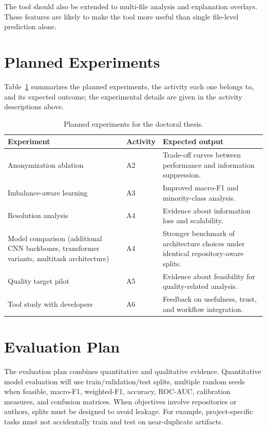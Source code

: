The tool should also be extended to multi-file analysis and explanation
overlays. These features are likely to make the tool more useful than single
file-level prediction alone.

\section{Planned Experiments}

Table~\ref{tab:planned-experiments} summarizes the planned experiments, the
activity each one belongs to, and its expected outcome; the experimental
details are given in the activity descriptions above.

\begin{table}[ht]
\centering
\caption{Planned experiments for the doctoral thesis.}
\label{tab:planned-experiments}
\begin{tabular}{p{}p{}p{}}
\toprule
\textbf{Experiment} & \textbf{Activity} & \textbf{Expected output} \\
\midrule
Anonymization ablation & A2 & Trade-off curves between performance and information suppression. \\
Imbalance-aware learning & A3 & Improved macro-F1 and minority-class analysis. \\
Resolution analysis & A4 & Evidence about information loss and scalability. \\
Model comparison (additional CNN backbones, transformer variants, multitask architecture) & A4 & Stronger benchmark of architecture choices under identical repository-aware splits. \\
Quality target pilot & A5 & Evidence about feasibility for quality-related analysis. \\
Tool study with developers & A6 & Feedback on usefulness, trust, and workflow integration. \\
\bottomrule
\end{tabular}
\fautor
\end{table}

\section{Evaluation Plan}

The evaluation plan combines quantitative and qualitative evidence. Quantitative
model evaluation will use train/validation/test splits, multiple random seeds
when feasible, macro-F1, weighted-F1, accuracy, ROC-AUC, calibration measures,
and confusion matrices. When objectives involve repositories or authors, splits
must be designed to avoid leakage. For example, project-specific tasks must not
accidentally train and test on near-duplicate artifacts.

